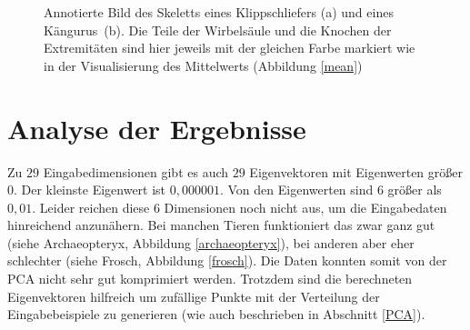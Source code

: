  \begin{figure}
  \qquad
  
  \caption{Annotierte Bild des Skeletts eines Klippschliefers (a) und eines \mbox{Kängurus (b)}. Die Teile der Wirbelsäule und die Knochen der Extremitäten sind hier jeweils mit der gleichen Farbe markiert wie in der Visualisierung des Mittelwerts (Abbildung \ref{mean})}
 \end{figure}
 

 \section{Analyse der Ergebnisse}
 \label{section_pca_result_analysis}
 
 Zu $29$ Eingabedimensionen gibt es auch $29$ Eigenvektoren mit Eigenwerten größer $0$. Der kleinste Eigenwert ist $0,000001$. Von den Eigenwerten sind $6$ größer als $0,01$. Leider reichen diese $6$ Dimensionen noch nicht aus, um die Eingabedaten hinreichend anzunähern. Bei manchen Tieren funktioniert das zwar ganz gut (siehe Archaeopteryx, Abbildung \ref{archaeopteryx}), bei anderen aber eher schlechter (siehe Frosch, Abbildung \ref{frosch}).
 Die Daten konnten somit von der PCA nicht sehr gut komprimiert werden. Trotzdem sind die berechneten Eigenvektoren hilfreich um zufällige Punkte mit der Verteilung der Eingabebeispiele zu generieren (wie auch beschrieben in Abschnitt \ref{PCA}).
 
